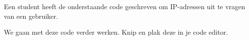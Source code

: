 Een student heeft de onderstaande code geschreven om IP-adressen uit te vragen van een gebruiker.


We gaan met deze code verder werken. Knip en plak deze in je code editor.

